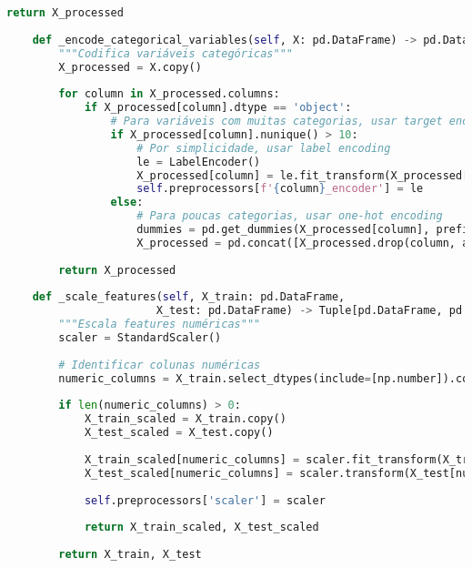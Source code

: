 \begin{pythonbox}
\begin{lstlisting}[language=Python]
        return X_processed
    
    def _encode_categorical_variables(self, X: pd.DataFrame) -> pd.DataFrame:
        """Codifica variáveis categóricas"""
        X_processed = X.copy()
        
        for column in X_processed.columns:
            if X_processed[column].dtype == 'object':
                # Para variáveis com muitas categorias, usar target encoding
                if X_processed[column].nunique() > 10:
                    # Por simplicidade, usar label encoding
                    le = LabelEncoder()
                    X_processed[column] = le.fit_transform(X_processed[column].astype(str))
                    self.preprocessors[f'{column}_encoder'] = le
                else:
                    # Para poucas categorias, usar one-hot encoding
                    dummies = pd.get_dummies(X_processed[column], prefix=column)
                    X_processed = pd.concat([X_processed.drop(column, axis=1), dummies], axis=1)
        
        return X_processed
    
    def _scale_features(self, X_train: pd.DataFrame, 
                       X_test: pd.DataFrame) -> Tuple[pd.DataFrame, pd.DataFrame]:
        """Escala features numéricas"""
        scaler = StandardScaler()
        
        # Identificar colunas numéricas
        numeric_columns = X_train.select_dtypes(include=[np.number]).columns
        
        if len(numeric_columns) > 0:
            X_train_scaled = X_train.copy()
            X_test_scaled = X_test.copy()
            
            X_train_scaled[numeric_columns] = scaler.fit_transform(X_train[numeric_columns])
            X_test_scaled[numeric_columns] = scaler.transform(X_test[numeric_columns])
            
            self.preprocessors['scaler'] = scaler
            
            return X_train_scaled, X_test_scaled
        
        return X_train, X_test
\end{lstlisting}
\end{pythonbox}

